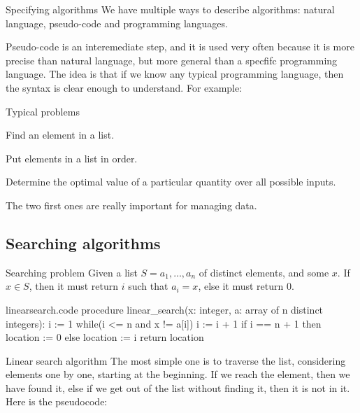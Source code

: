 \documentclass[a4paper]{article}
\begin{document}
\begin{parag}{Specifying algorithms}
    We have multiple ways to describe algorithms: natural language, pseudo-code and programming languages.

    Pseudo-code is an interemediate step, and it is used very often because it is more precise than natural language, but more general than a specfifc programming language. The idea is that if we know any typical programming language, then the syntax is clear enough to understand. For example:
    
\end{parag}

\begin{parag}{Typical problems}
   \begin{description}[left=0pt]
       \item[Searching problems:] Find an element in a list.
       \item[Sorting problems:] Put elements in a list in order.
       \item[Optimisation problems:] Determine the optimal value of a particular quantity over all possible inputs.
   \end{description}

   The two first ones are really important for managing data.

\end{parag}

\subsection{Searching algorithms}
\begin{parag}{Searching problem}
    Given a list $S = a_1, \ldots, a_n$ of distinct elements, and some $x$. If $x \in S$, then it must return $i$ such that $a_i = x$, else it must return 0.
\end{parag}

\begin{filecontents*}[overwrite]{linearsearch.code}
procedure linear_search(x: integer, a: array of n distinct integers):
    i := 1
    while(i <= n and x != a[i])
        i := i + 1
    if i == n + 1 then location := 0 else location := i
    return location
\end{filecontents*}

\begin{parag}{Linear search algorithm}
    The most simple one is to traverse the list, considering elements one by one, starting at the beginning. If we reach the element, then we have found it, else if we get out of the list without finding it, then it is not in it. Here is the pseudocode:
\end{parag}
\end{document}
